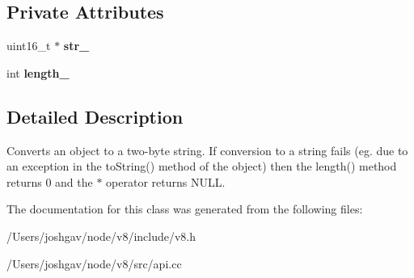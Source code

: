 \subsection*{Private Attributes}
\begin{DoxyCompactItemize}
\item 
uint16\+\_\+t $\ast$ {\bfseries str\+\_\+}\hypertarget{classv8_1_1_string_1_1_value_ac929f3bce35eb780a6f50ae0e8e286da}{}\label{classv8_1_1_string_1_1_value_ac929f3bce35eb780a6f50ae0e8e286da}

\item 
int {\bfseries length\+\_\+}\hypertarget{classv8_1_1_string_1_1_value_a616a68e7b525605cb2325990d660c900}{}\label{classv8_1_1_string_1_1_value_a616a68e7b525605cb2325990d660c900}

\end{DoxyCompactItemize}


\subsection{Detailed Description}
Converts an object to a two-\/byte string. If conversion to a string fails (eg. due to an exception in the to\+String() method of the object) then the length() method returns 0 and the $\ast$ operator returns N\+U\+LL. 

The documentation for this class was generated from the following files\+:\begin{DoxyCompactItemize}
\item 
/\+Users/joshgav/node/v8/include/v8.\+h\item 
/\+Users/joshgav/node/v8/src/api.\+cc\end{DoxyCompactItemize}
